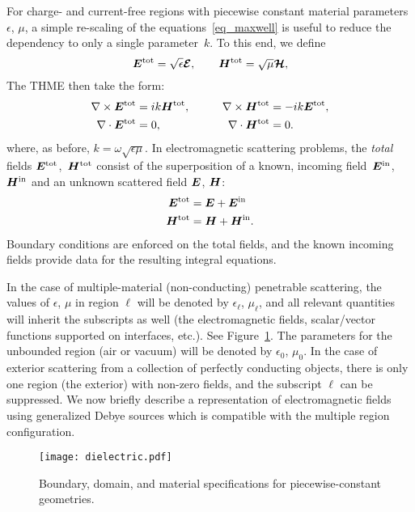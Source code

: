\documentclass[11pt]{article}
\newcommand{\vct}{\vectorsym}
\newcommand{\bE}{\vectorsym{E}}
\newcommand{\bcE}{\bm{{\mathcal E}}}
\newcommand{\bcH}{\bm{\mathcal H}}
\newcommand{\bH}{\vct{ H}}
\newcommand\bEtot{\vct{E}^\textnormal{tot}}
\newcommand\bHtot{\vct{H}^\textnormal{tot}}
\newcommand\bEin{\vct{E}^\textnormal{in}}
\newcommand\bHin{\vct{H}^\textnormal{in}}
\numberwithin{equation}{section}
\begin{document}
For charge- and current-free regions with piecewise constant material
parameters $\epsilon$, $\mu$, a simple re-scaling of the
equations~\eqref{eq_maxwell} is useful to reduce the dependency to
only a single parameter~$k$. To this end, we define
\begin{equation}
  \bEtot = \sqrt{\epsilon} \bcE, \qquad
  \bHtot = \sqrt{\mu} \bcH,
\end{equation}
The THME then take the form:
\begin{equation}
\label{eq_maxwell_k}
  \begin{aligned}
    \nabla \times \bEtot &= i k \bHtot, 
    &\qquad \nabla \times \bHtot &= - ik \bEtot,\\
    \nabla \cdot \bEtot &= 0, & \nabla \cdot \bHtot &= 0.
  \end{aligned}
\end{equation}
where, as before, $k=\omega \sqrt{\epsilon\mu}$.  In electromagnetic
scattering problems, the \emph{total} fields $\bEtot$,~$\bHtot$
consist of the superposition of a known, incoming field~$\bEin$,
$\bHin$ and an unknown scattered field $\bE$, $\bH$:
\begin{equation}
  \begin{aligned}
    \bEtot &= \bE + \bEin \\
    \bHtot &= \bH + \bHin.
  \end{aligned}
\end{equation}
Boundary conditions are enforced on the total fields, and the known
incoming fields provide data for the resulting integral equations.

In the case of
multiple-material (non-conducting) penetrable scattering, the values
of $\epsilon$, $\mu$ in region $\ell$ will be denoted by
$\epsilon_\ell$, $\mu_\ell$, and all relevant quantities will inherit
the subscripts as well (the electromagnetic fields, scalar/vector
functions supported on interfaces, etc.). See
Figure~\ref{fig_dielectric}. The parameters for the
unbounded region (air or vacuum) will be denoted by $\epsilon_0$,
$\mu_0$.  In the case of exterior scattering from a collection of perfectly
conducting objects, there is only one region (the exterior)
with non-zero fields, and the subscript $\ell$ can be suppressed.
We now briefly describe a representation of electromagnetic fields using
generalized Debye sources which is compatible with the multiple region
configuration. 

\begin{figure}[t]
  \centering
  \texttt{[image: dielectric.pdf]}
  \caption{Boundary, domain, and material specifications for
    piecewise-constant geometries.}
  \label{fig_dielectric}
\end{figure}
\end{document}
